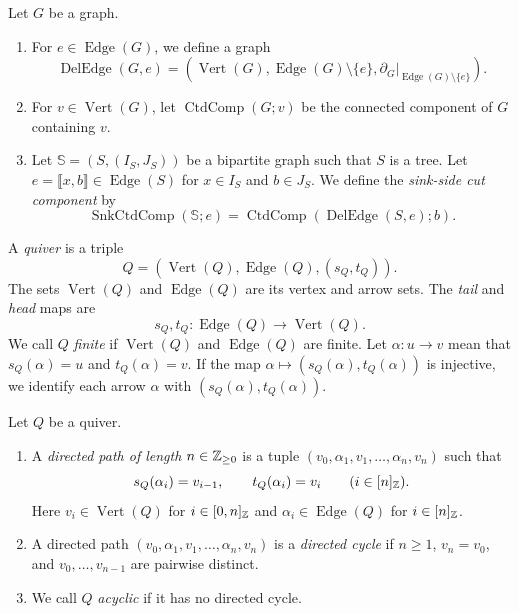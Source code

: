 \begin{definition}\label{def:cut-components}
Let $G$ be a graph.
\begin{enumerate}[font=\itshape]
\item\label{d:edge-deletion} For $e\in\operatorname{Edge}(G)$, we define a graph
\[
 \operatorname{DelEdge}(G,e)
 =\left(\operatorname{Vert}(G),\operatorname{Edge}(G)\setminus\{e\},
 \partial_G\big|_{\operatorname{Edge}(G)\setminus\{e\}}\right).
\]
\item\label{d:vertex-component} For $v\in\operatorname{Vert}(G)$, let $\operatorname{CtdComp}(G;v)$ be the connected component of $G$ containing $v$.
\item\label{d:sink-cut-component} Let $\mathbb S=(S,(I_S,J_S))$ be a bipartite graph such that $S$ is a tree.
Let $e=\llbracket x,b\rrbracket\in\operatorname{Edge}(S)$ for $x\in I_S$ and $b\in J_S$.
We define the \textit{sink-side cut component} by
\[
 \operatorname{SnkCtdComp}(\mathbb S;e)=\operatorname{CtdComp}(\operatorname{DelEdge}(S,e);b).
\]
\end{enumerate}
\end{definition}

\begin{definition}[Quivers]\label{def:quivers}
A \textit{quiver} is a triple
\[
 Q=(\operatorname{Vert}(Q),\operatorname{Edge}(Q),(s_Q,t_Q)).
\]
The sets $\operatorname{Vert}(Q)$ and $\operatorname{Edge}(Q)$ are its vertex and arrow sets.
The \textit{tail} and \textit{head} maps are
\[
 s_Q,t_Q:\operatorname{Edge}(Q)\longrightarrow\operatorname{Vert}(Q).
\]
We call $Q$ \textit{finite} if $\operatorname{Vert}(Q)$ and $\operatorname{Edge}(Q)$ are finite.
Let $\alpha:u\to v$ mean that $s_Q(\alpha)=u$ and $t_Q(\alpha)=v$.
If the map $\alpha\mapsto(s_Q(\alpha),t_Q(\alpha))$ is injective, we identify each arrow $\alpha$ with
$(s_Q(\alpha),t_Q(\alpha))$.
\end{definition}

\begin{definition}\label{def:directed-paths}
Let $Q$ be a quiver.
\begin{enumerate}[font=\itshape]
\item\label{d:quiver-directed-path} A \textit{directed path of length $n\in\mathbb Z_{\ge0}$} is a tuple
$(v_0,\alpha_1,v_1,\ldots,\alpha_n,v_n)$ such that
\[
 s_Q(\alpha_i)=v_{i-1},\qquad t_Q(\alpha_i)=v_i\qquad(i\in[n]_{\mathbb Z}).
\]
Here $v_i\in\operatorname{Vert}(Q)$ for $i\in[0,n]_{\mathbb Z}$ and
$\alpha_i\in\operatorname{Edge}(Q)$ for $i\in[n]_{\mathbb Z}$.
\item\label{d:quiver-directed-cycle} A directed path $(v_0,\alpha_1,v_1,\ldots,\alpha_n,v_n)$ is a \textit{directed cycle} if $n\ge1$, $v_n=v_0$, and $v_0,\ldots,v_{n-1}$ are pairwise distinct.
\item\label{d:quiver-acyclic} We call $Q$ \textit{acyclic} if it has no directed cycle.
\end{enumerate}
\end{definition}

